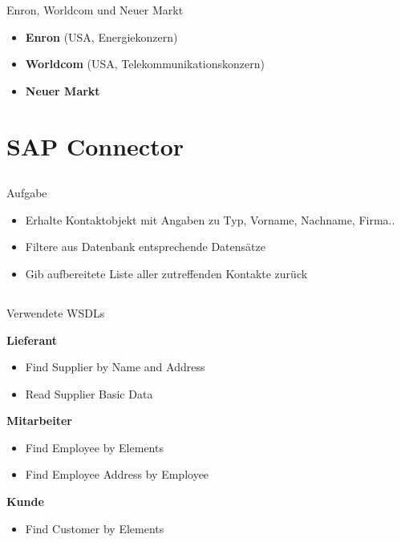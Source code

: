 \documentclass[xcolor={usenames,dvipsnames}, compress, 10pt]{beamer}
\begin{document}
\begin{frame}{Enron, Worldcom und Neuer Markt}
\begin{itemize}
	\pause
	\item \textbf{Enron} (USA, Energiekonzern)
	\pause
	\item \textbf{Worldcom} (USA, Telekommunikationskonzern)
	\pause
	\item \textbf{Neuer Markt}
\end{itemize}
\end{frame}



\section{SAP Connector}

\subsection*{}

\begin{frame}{Aufgabe}
\begin{center}

\begin{itemize}
\item Erhalte Kontaktobjekt mit Angaben zu Typ, Vorname, Nachname, Firma..
\item Filtere aus Datenbank entsprechende Datensätze
\item Gib aufbereitete Liste aller zutreffenden Kontakte zurück
\end{itemize}

\end{center}
\end{frame}

\subsection*{}

\begin{frame}{Verwendete WSDLs}
\begin{center}

\textbf{Lieferant}
\begin{itemize}
\item Find Supplier by Name and Address
\item Read Supplier Basic Data 
\end{itemize}

\textbf{Mitarbeiter}
\begin{itemize}
\item Find Employee by Elements
\item Find Employee Address by Employee
\end{itemize}

\textbf{Kunde}
\begin{itemize}
\item Find Customer by Elements
\end{itemize}



\end{center}
\end{frame}
\end{document}
